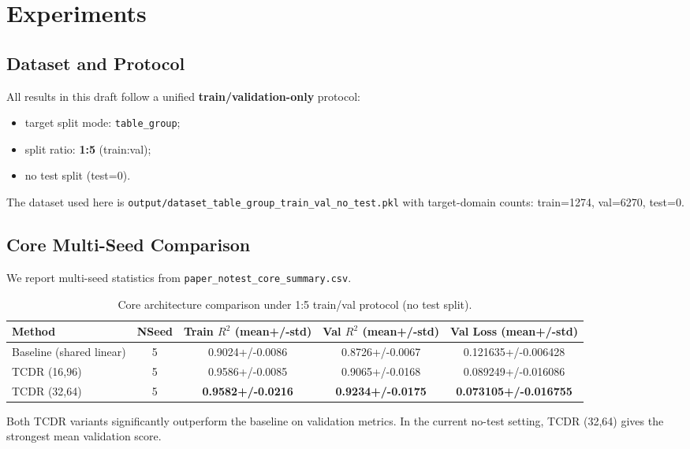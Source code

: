 \section{Experiments}
\label{sec:results}

\subsection{Dataset and Protocol}
All results in this draft follow a unified \textbf{train/validation-only} protocol:
\begin{itemize}
  \item target split mode: \texttt{table\_group};
  \item split ratio: \textbf{1:5} (train:val);
  \item no test split (test=0).
\end{itemize}

The dataset used here is \texttt{output/dataset\_table\_group\_train\_val\_no\_test.pkl}
with target-domain counts:
train=1274, val=6270, test=0.

\subsection{Core Multi-Seed Comparison}
We report multi-seed statistics from
\texttt{paper\_notest\_core\_summary.csv}.

\begin{table}[htbp]
\centering
\small
\setlength{\tabcolsep}{4pt}
\begin{tabular}{lcccc}
\toprule
Method & NSeed & Train $R^2$ (mean+/-std) & Val $R^2$ (mean+/-std) & Val Loss (mean+/-std) \\
\midrule
Baseline (shared linear) & 5 & 0.9024+/-0.0086 & 0.8726+/-0.0067 & 0.121635+/-0.006428 \\
TCDR (16,96) & 5 & 0.9586+/-0.0085 & 0.9065+/-0.0168 & 0.089249+/-0.016086 \\
TCDR (32,64) & 5 & \textbf{0.9582+/-0.0216} & \textbf{0.9234+/-0.0175} & \textbf{0.073105+/-0.016755} \\
\bottomrule
\end{tabular}
\caption{Core architecture comparison under 1:5 train/val protocol (no test split).}
\label{tab:notest_core}
\end{table}

Both TCDR variants significantly outperform the baseline on validation metrics.
In the current no-test setting, TCDR (32,64) gives the strongest mean validation score.


